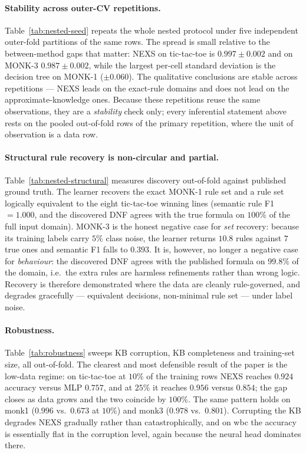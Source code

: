 \documentclass[11pt]{article}
\newcommand{\nexs}{\textsc{NEXS}}
\begin{document}


\paragraph{Stability across outer-CV repetitions.}
Table~\ref{tab:nested-seed} repeats the whole nested protocol under five
independent outer-fold partitions of the same rows. The spread is small relative
to the between-method gaps that matter: \nexs{} on tic-tac-toe is
$0.997\pm0.002$ and on MONK-3 $0.987\pm0.002$, while the largest per-cell
standard deviation is the decision tree on MONK-1 ($\pm0.060$). The
qualitative conclusions are stable across repetitions --- \nexs{} leads on the
exact-rule domains and does not lead on the approximate-knowledge ones. Because
these repetitions reuse the same observations, they are a \emph{stability} check
only; every inferential statement above rests on the pooled out-of-fold rows of
the primary repetition, where the unit of observation is a data row.



\paragraph{Structural rule recovery is non-circular and partial.}
Table~\ref{tab:nested-structural} measures discovery out-of-fold against published
ground truth. The learner recovers the exact MONK-1 rule set and a rule set
logically equivalent to the eight tic-tac-toe winning lines (semantic rule F1
$=1.000$, and the discovered DNF agrees with the true formula on $100\%$ of the
full input domain). MONK-3 is the honest negative case for \emph{set} recovery:
because its training labels carry $5\%$ class noise, the learner returns $10.8$
rules against $7$ true ones and semantic F1 falls to $0.393$. It is, however, no
longer a negative case for \emph{behaviour}: the discovered DNF agrees with the
published formula on $99.8\%$ of the domain, i.e.\ the extra rules are harmless
refinements rather than wrong logic. Recovery is therefore demonstrated where the
data are cleanly rule-governed, and degrades gracefully --- equivalent decisions,
non-minimal rule set --- under label noise.



\paragraph{Robustness.}
Table~\ref{tab:robustness} sweeps KB corruption, KB completeness and training-set
size, all out-of-fold. The clearest and most defensible result of the paper is
the low-data regime: on tic-tac-toe at $10\%$ of the training rows \nexs{} reaches
$0.924$ accuracy versus MLP $0.757$, and at $25\%$ it reaches $0.956$ versus
$0.854$; the gap closes as data grows and the two coincide by $100\%$. The same
pattern holds on monk1 ($0.996$ vs.\ $0.673$ at $10\%$) and monk3 ($0.978$
vs.\ $0.801$). Corrupting the KB degrades \nexs{} gradually
rather than catastrophically, and on wbc the accuracy is essentially flat in the
corruption level, again because the neural head dominates there.
\end{document}
